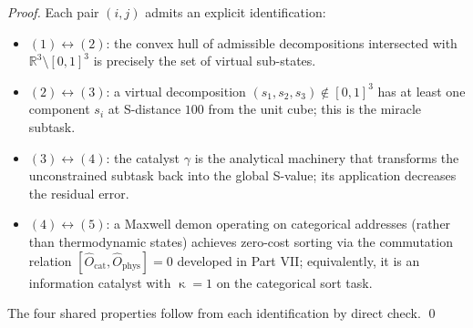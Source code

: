\documentclass[twocolumn,a4paper]{article}
\DeclareMathOperator{\catpow}{\kappa}
\newcommand{\Real}{\mathbb{R}}
\newcommand{\Ocat}{\hat{O}_{\mathrm{cat}}}
\newcommand{\Ophys}{\hat{O}_{\mathrm{phys}}}
\begin{document}
\begin{proof}
Each pair $(i,j)$ admits an explicit identification:
\begin{itemize}[nosep,leftmargin=*]
\item $(1)\leftrightarrow(2)$: the convex hull of admissible decompositions intersected with $\Real^{3}\setminus[0,1]^{3}$ is precisely the set of virtual sub-states.
\item $(2)\leftrightarrow(3)$: a virtual decomposition $(s_{1},s_{2},s_{3})\notin[0,1]^{3}$ has at least one component $s_{i}$ at S-distance $100$ from the unit cube; this is the miracle subtask.
\item $(3)\leftrightarrow(4)$: the catalyst $\gamma$ is the analytical machinery that transforms the unconstrained subtask back into the global S-value; its application decreases the residual error.
\item $(4)\leftrightarrow(5)$: a Maxwell demon operating on categorical addresses (rather than thermodynamic states) achieves zero-cost sorting via the commutation relation $[\Ocat,\Ophys]=0$ developed in Part VII; equivalently, it is an information catalyst with $\catpow=1$ on the categorical sort task.
\end{itemize}
The four shared properties follow from each identification by direct check. \qed
\end{proof}
\end{document}
